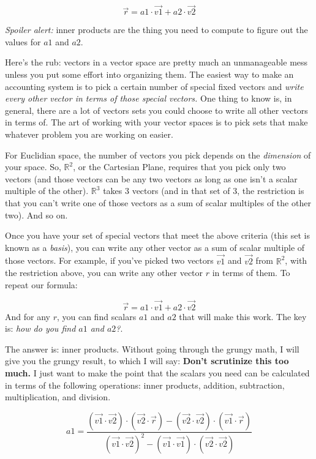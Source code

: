 \documentclass[
]{book}
\begin{document}
\[\vec{r} = a1\cdot\vec{v1} + a2\cdot\vec{v2}\]

\emph{Spoiler alert:} inner products are the thing you need to compute to figure out the values for \(a1\) and \(a2\).

Here's the rub: vectors in a vector space are pretty much an unmanageable mess unless you put some effort into organizing them. The easiest way to make an accounting system is to pick a certain number of special fixed vectors and \emph{write every other vector in terms of those special vectors.} One thing to know is, in general, there are a lot of vectors sets you could choose to write all other vectors in terms of. The art of working with your vector spaces is to pick sets that make whatever problem you are working on easier.

For Euclidian space, the number of vectors you pick depends on the \emph{dimension} of your space. So, \(\mathbb{R}^2\), or the Cartesian Plane, requires that you pick only two vectors (and those vectors can be any two vectors as long as one isn't a scalar multiple of the other). \(\mathbb{R}^3\) takes 3 vectors (and in that set of 3, the restriction is that you can't write one of those vectors as a sum of scalar multiples of the other two). And so on.

Once you have your set of special vectors that meet the above criteria (this set is known as a \emph{basis}), you can write any other vector as a sum of scalar multiple of those vectors. For example, if you've picked two vectors \(\vec{v1}\) and \(\vec{v2}\) from \(\mathbb{R}^2\), with the restriction above, you can write any other vector \(r\) in terms of them. To repeat our formula:

\[\vec{r} = a1\cdot\vec{v1} + a2\cdot\vec{v2}\]
And for any \(r\), you can find scalars \(a1\) and \(a2\) that will make this work. The key is: \emph{how do you find \(a1\) and \(a2\)?}.

The answer is: inner products. Without going through the grungy math, I will give you the grungy result, to which I will say: \textbf{Don't scrutinize this too much.} I just want to make the point that the scalars you need can be calculated in terms of the following operations: inner products, addition, subtraction, multiplication, and division.

\[a1 = \frac{(\vec{v1}\cdot\vec{v2})\cdot(\vec{v2}\cdot\vec{r})-(\vec{v2}\cdot\vec{v2})\cdot(\vec{v1}\cdot\vec{r})}{(\vec{v1}\cdot\vec{v2})^2 - (\vec{v1}\cdot\vec{v1})\cdot(\vec{v2}\cdot\vec{v2})}\]
\end{document}
